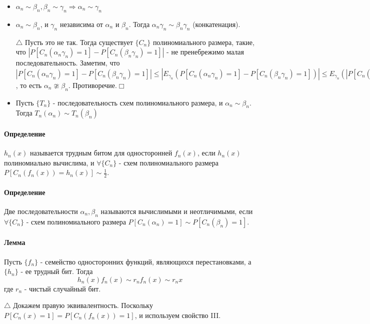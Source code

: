 \documentclass[12pt, a4paper]{article}
\begin{document}
\begin{itemize}
 \item[1)] $\alpha_n \sim \beta_n, \beta_n \sim \gamma_n \Rightarrow \alpha_n \sim \gamma_n$
 \item[2)] $\alpha_n \sim \beta_n$, и $\gamma_n$ независима от $\alpha_n$ и $\beta_n$. Тогда $\alpha_n\gamma_n \sim \beta_n\gamma_n$ (конкатенация).
 
 $\triangle$ Пусть это не так. Тогда существует $\{C_n\}$ полиномиального размера, такие, что $|P[C_n(\alpha_n\gamma_n)=1] - P[C_n(\beta_n\gamma_n)=1]|$ - не пренебрежимо малая последовательность. Заметим, что $|P[C_n(\alpha_n\gamma_n)=1] - P[C_n(\beta_n\gamma_n)=1]| \leq |E_{\gamma_n}(P[C_n(\alpha_n\gamma_n)=1] - P[C_n(\beta_n\gamma_n)=1])| \leq E_{\gamma_n}(|P[C_n(\alpha_n\gamma_n)=1] - P[C_n(\beta_n\gamma_n)=1]|) \leq |P[C_n(\alpha_n\gamma_{max})=1] - P[C_n(\beta_n\gamma_{max})=1])|$, то есть $\alpha_n \ncong \beta_n$. Противоречие.$\Box$
 \item[3)] Пусть $\{T_n\}$ - последовательность схем полиномиального размера, и $\alpha_n \sim \beta_n$. Тогда $T_n(\alpha_n) \sim T_n(\beta_n)$
\end{itemize}

\paragraph{Определение} $h_n(x)$ называется трудным битом для односторонней $f_n(x)$, если $h_n(x)$ полиномиально вычислима, и $\forall \{C_n\}$ - схем полиномиального размера $P[C_n(f_n(x))=h_n(x)] \sim \frac{1}{2}$.

\paragraph{Определение} Две последовательности $\alpha_n, \beta_n$ называются вычислимыми и неотличимыми, если $\forall \{C_n\}$ - схем полиномиального размера $P[C_n(\alpha_n)=1] \sim P[C_n(\beta_n)=1]$.

\paragraph{Лемма} Пусть $\{f_n\}$ - семейство односторонних функций, являющихся перестановками, а $\{h_n\}$ - ее трудный бит. Тогда
\[
 h_n(x)f_n(x) \sim r_n f_n(x) \sim r_n x
\]
где $r_n$ - чистый случайный бит.

$\triangle$ Докажем правую эквивалентность. Поскольку $P[C_n(x)=1]=P[C_n(f_n(x))=1]$, и используем свойство III.
\end{document}
